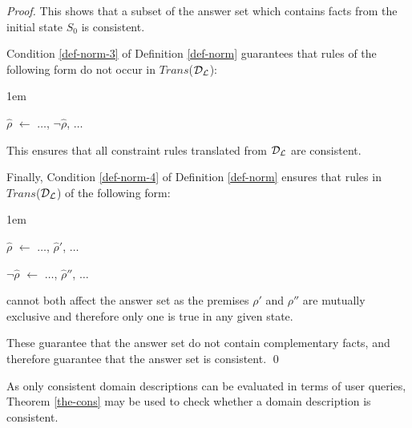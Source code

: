\documentclass[global,twocolumn,final]{svjour}
\newenvironment{vproof}
  {\begin{proof}\hspace{0.25em}}
  {\qed\end{proof}}
\newenvironment{vquote}
  {\begin{list}{}{\leftmargin 1em}\item[]}
  {\end{list}}
\begin{document}
\begin{vproof}
      \noindent
      This shows that a subset of the answer set which contains facts from the
      initial state $S_{0}$ is consistent.

      Condition \ref{def-norm-3} of Definition \ref{def-norm} guarantees that
      rules of the following form do not occur in $Trans$(${\cal D}_{\cal L}$):

      \begin{vquote}
        $\hat{\rho}$ $\leftarrow$ $\hdots$, $\lnot\hat{\rho}$, $\hdots$
      \end{vquote}

      \noindent
      This ensures that all constraint rules translated from
      ${\cal D}_{\cal L}$ are consistent.

      Finally, Condition \ref{def-norm-4} of Definition \ref{def-norm}
      ensures that rules in $Trans$(${\cal D}_{\cal L}$) of the following form:

      \begin{vquote}
        $\hat{\rho}$ $\leftarrow$ $\hdots$, $\hat{\rho}'$, $\hdots$

        $\lnot \hat{\rho}$ $\leftarrow$ $\hdots$, $\hat{\rho}''$, $\hdots$
      \end{vquote}

      \noindent
      cannot both affect the answer set as the premises $\rho'$ and $\rho''$
      are mutually exclusive and therefore only one is true in any given state.

      These guarantee that the answer set do not contain complementary facts,
      and therefore guarantee that the answer set is consistent.
    \end{vproof}

    As only consistent domain descriptions can be evaluated in terms of user
    queries, Theorem \ref{the-cons} may be used to check whether a domain
    description is consistent.
\end{document}
